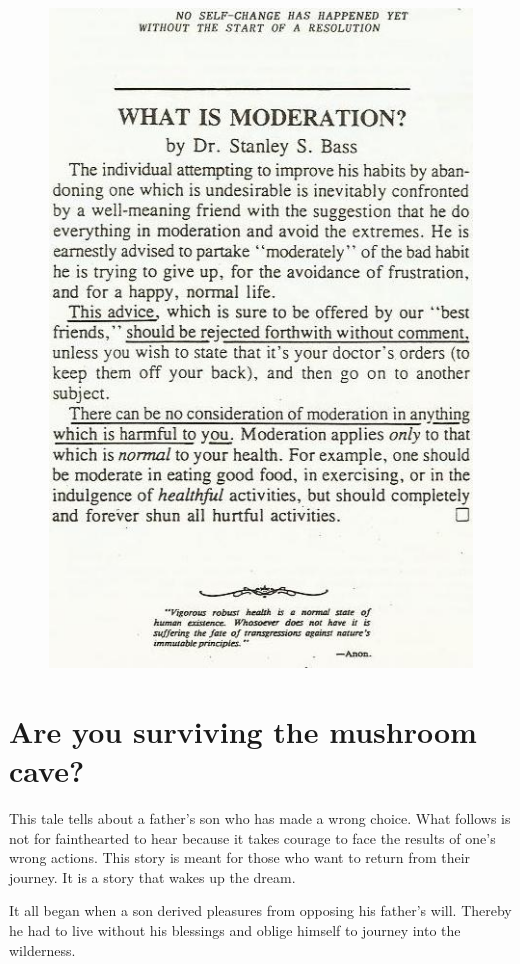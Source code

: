 \documentclass[12pt,letterpaper]{article}
\begin{document}
\begin{figure} \centering
  \includegraphics[height=\textheight,bb=0 0 440 685]{p4.jpg}
\end{figure}

\section{Are you surviving the mushroom cave?}

This tale tells about a father's son who has made a wrong choice. What
follows is not for fainthearted to hear because it takes courage to
face the results of one's wrong actions. This story is meant for those
who want to return from their journey. It is a story that wakes up the
dream.

It all began when a son derived pleasures from opposing his father's
will.  Thereby he had to live without his blessings and oblige himself
to journey into the wilderness.
\end{document}

